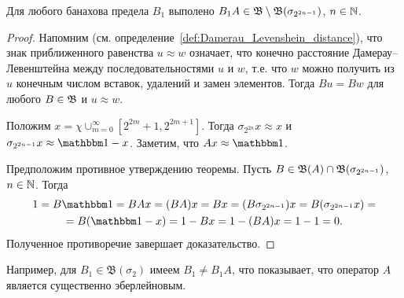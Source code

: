 \begin{lemma}
	Для любого банахова предела $B_1$ выполено $B_1 A \in \mathfrak B \setminus \mathfrak{B} (\sigma_{2^{2n-1}})$, $n\in \mathbb{N}$.
\end{lemma}

\begin{proof}
	Напомним (см. определение~\ref{def:Damerau_Levenshein_distance}), что знак приближенного равенства $ u \approx w$ означает,
	что конечно расстояние Дамерау--Левенштейна между последовательностями
	$u$ и $w$,
	т.е. что $w$ можно получить из $u$ конечным числом вставок, удалений и замен элементов.
	Тогда $Bu = Bw$ для любого $B\in\mathfrak{B}$ и $u \approx w$.

	Положим $x = \chi {\cup_{m=0}^{\infty}\left[2^{2 m}+1, 2^{2 m+1}\right]}$.
	Тогда $\sigma_{2^{2n}} x \approx x$ и $\sigma_{2^{2n-1}} x \approx \one - x$.
	Заметим, что $Ax \approx \one$.

	Предположим противное утверждению теоремы.
	Пусть $B \in \mathfrak{B}(A) \cap \mathfrak{B} (\sigma_{2^{2n-1}})$, $n\in \mathbb{N}$.
	Тогда
	\begin{multline}
		1 = B\one = BAx = (BA)x = Bx =
		(B\sigma_{2^{2n-1}}) x = B (\sigma_{2^{2n-1}} x) =
		\\=
		B(\one -x) = 1 - Bx = 1 - (BA)x = 1-1 = 0
		.
	\end{multline}
	Полученное противоречие завершает доказательство.
\end{proof}

\begin{remark}
	Например, для $B_1 \in \mathfrak B (\sigma_2)$ имеем $B_1 \ne B_1 A$, что показывает,
	что оператор $A$ является существенно эберлейновым.
\end{remark}

